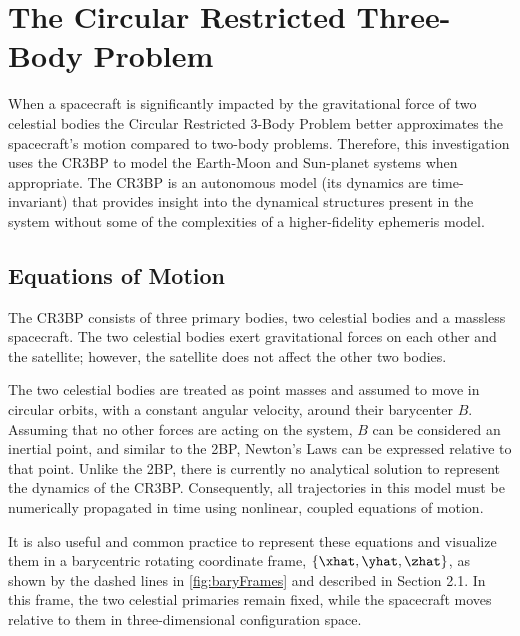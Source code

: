 \section{The Circular Restricted Three-Body Problem}
When a spacecraft is significantly impacted by the gravitational force of two celestial bodies the
Circular Restricted 3-Body Problem better approximates the spacecraft's motion compared to two-body
problems. Therefore, this investigation uses the CR3BP to model the Earth-Moon and Sun-planet
systems when appropriate. The CR3BP is an autonomous model (its dynamics are time-invariant) that
provides insight into the dynamical structures present in the system without some of the
complexities of a higher-fidelity ephemeris model.

\subsection{Equations of Motion}
The CR3BP consists of three primary bodies, two celestial bodies and a massless spacecraft. The two
celestial bodies exert gravitational forces on each other and the satellite; however, the satellite
does not affect the other two bodies. 

The two celestial bodies are treated as point masses and assumed to move in circular orbits, with a
constant angular velocity, around their barycenter $B$. Assuming that no other forces are acting on
the system, $B$ can be considered an inertial point, and similar to the 2BP, Newton's Laws can be
expressed relative to that point. Unlike the 2BP, there is currently no analytical solution to
represent the dynamics of the CR3BP. Consequently, all trajectories in this model must be
numerically propagated in time using nonlinear, coupled equations of motion.

It is also useful and common practice to represent these equations and visualize them in a
barycentric rotating coordinate frame, $\{\xhat,\yhat,\zhat\}$, as shown by the dashed lines in
\cref{fig:baryFrames} and described in Section 2.1. In this frame, the two celestial primaries
remain fixed, while the spacecraft moves relative to them in three-dimensional configuration space.

